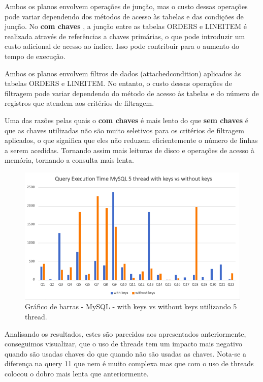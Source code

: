 \documentclass{article}
\begin{document}
Ambos os planos envolvem operações de junção, mas o custo dessas operações pode variar dependendo dos métodos de acesso às tabelas e das condições de junção. No \textbf{com chaves} , a junção entre as tabelas ORDERS e LINEITEM é realizada através de referências a chaves primárias, o que pode introduzir um custo adicional de acesso ao índice. Isso pode contribuir para o aumento do tempo de execução.

Ambos os planos envolvem filtros de dados (attached\underline{}condition) aplicados às tabelas ORDERS e LINEITEM. No entanto, o custo dessas operações de filtragem pode variar dependendo do método de acesso às tabelas e do número de registros que atendem aos critérios de filtragem.

Uma das razões pelas quais o \textbf{com chaves} é mais lento do que \textbf{sem chaves} é que as chaves utilizadas não são muito seletivos para os critérios de filtragem aplicados, o que significa que eles não reduzem eficientemente o número de linhas a serem acedidas. Tornando assim mais leituras de disco e operações de acesso à memória, tornando a consulta mais lenta.



\begin{figure}[H]
  \centering
  \includegraphics[width=\textwidth]{Graphs/mysql5threads_withkeys_withoutkeys.png}
  \caption{Gráfico de barras - MySQL - with keys vs without keys utilizando 5 thread.} 
  \label{fig:PKCreation2}
\end{figure}

Analisando os resultados, estes são parecidos aos apresentados anteriormente, conseguimos visualizar, que o uso de threads tem um impacto mais negativo quando são usadas chaves do que quando não são usadas as chaves. Nota-se a diferença na query 11 que nem é muito complexa mas que com o uso de threads colocou o dobro mais lenta que anteriormente.
\end{document}
